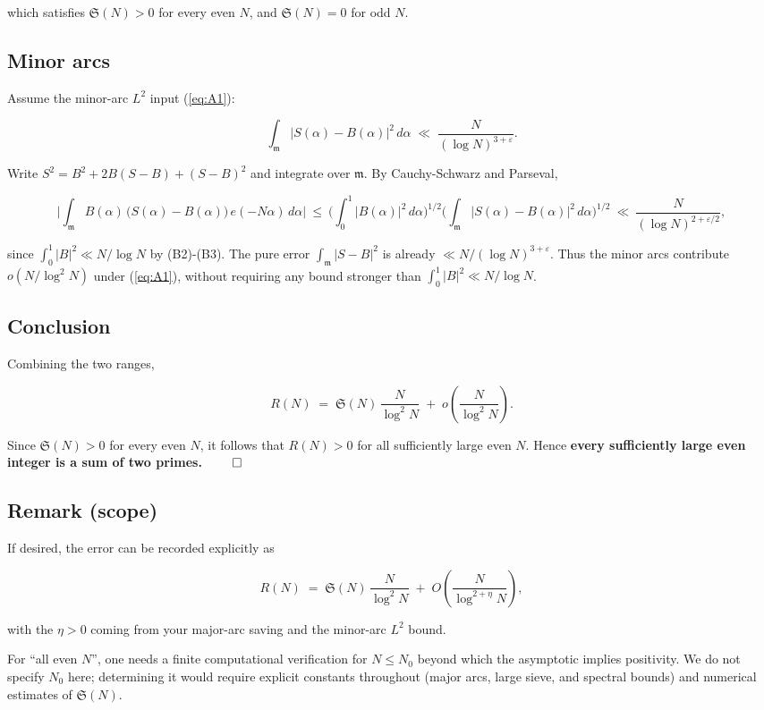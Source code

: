 \documentclass[11pt]{article}
\def\eqref#1{(\ref{#1})}%
\theoremstyle{definition}
\theoremstyle{remark}
\numberwithin{equation}{part}
\begin{document}
which satisfies $\mathfrak S(N)>0$ for every even $N$, and $\mathfrak S(N)=0$ for odd $N$.

\subsection{Minor arcs}

Assume the minor-arc $L^2$ input \eqref{eq:A1}:

$$
	\int_{\mathfrak m} |S(\alpha)-B(\alpha)|^2\,d\alpha
	\;\ll\;\frac{N}{(\log N)^{3+\varepsilon}}.
$$

Write $S^2=B^2+2B(S-B)+(S-B)^2$ and integrate over $\mathfrak m$.
By Cauchy-Schwarz and Parseval,

$$
	\Big|\int_{\mathfrak m} B(\alpha)\,\big(S(\alpha)-B(\alpha)\big)\,e(-N\alpha)\,d\alpha\Big|
	\ \le\ \Big(\int_0^1 |B(\alpha)|^2\,d\alpha\Big)^{1/2}
	\Big(\int_{\mathfrak m}|S(\alpha)-B(\alpha)|^2\,d\alpha\Big)^{1/2}
	\ \ll\ \frac{N}{(\log N)^{2+\varepsilon/2}},
$$

since $\int_0^1|B|^2\ll N/\log N$ by (B2)-(B3). The pure error $\int_{\mathfrak m}|S-B|^2$ is already $\ll N/(\log N)^{3+\varepsilon}$. Thus the minor arcs contribute $o\!\left(N/\log^2 N\right)$ under \eqref{eq:A1}, without requiring any bound stronger than $\int_0^1|B|^2\ll N/\log N$.

\subsection{Conclusion}

Combining the two ranges,

$$
	R(N)
	\;=\;\mathfrak S(N)\,\frac{N}{\log^2 N}\;+\;o\!\left(\frac{N}{\log^2 N}\right).
$$

Since $\mathfrak S(N)>0$ for every even $N$, it follows that $R(N)>0$ for all sufficiently large even $N$. Hence \textbf{every sufficiently large even integer is a sum of two primes.} $\qed$

\subsection{Remark (scope)}
If desired, the error can be recorded explicitly as

$$
	R(N)\;=\;\mathfrak S(N)\,\frac{N}{\log^2 N}\;+\;O\!\left(\frac{N}{\log^{2+\eta}N}\right),
$$

with the $\eta>0$ coming from your major-arc saving and the minor-arc $L^2$ bound.

For “all even $N$”, one needs a finite computational verification for $N\le N_0$ beyond which the asymptotic implies positivity. We do not specify $N_0$ here; determining it would require explicit constants throughout (major arcs, large sieve, and spectral bounds) and numerical estimates of $\mathfrak S(N)$.
\end{document}
